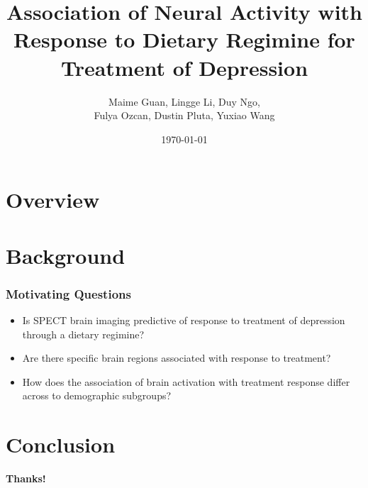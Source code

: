 \documentclass{beamer}
\title[]{Association of Neural Activity with Response to Dietary Regimine 
for Treatment of Depression} %
\author{Maime Guan, Lingge Li, Duy Ngo, \\Fulya Ozcan, Dustin Pluta, Yuxiao Wang} %
\institute[UCI] %
{
 \\ %
\medskip
\textit{} %
}
\date{\today} %
\begin{document}
\begin{frame}
\titlepage %
\end{frame}


\section*{Overview}

\begin{frame}
\tableofcontents
\end{frame}


\section{Background}

\begin{frame}
\frametitle{Motivating Questions}
\begin{itemize}
\item Is SPECT brain imaging predictive of response to treatment of depression through a dietary regimine?
\item Are there specific brain regions associated with response to treatment?
\item How does the association of brain activation with treatment response differ across to demographic subgroups?
\end{itemize}
\end{frame}


\section{Conclusion}
\begin{frame}
\centering
\Large
\textbf{Thanks!}
\end{frame}
\end{document}

